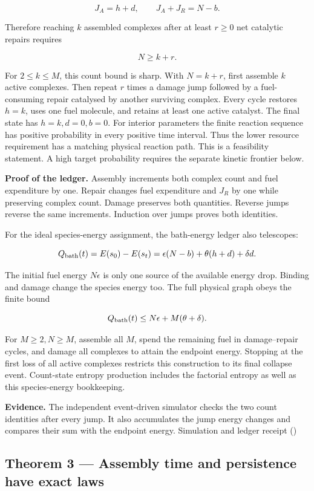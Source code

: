 \documentclass[
  11pt,
]{article}
\begin{document}
\[
J_A=h+d,\qquad J_A+J_R=N-b.
\]

Therefore reaching \(k\) assembled complexes after at least \(r\ge0\)
net catalytic repairs requires

\[
N\ge k+r.
\]

For \(2\le k\le M\), this count bound is sharp. With \(N=k+r\), first
assemble \(k\) active complexes. Then repeat \(r\) times a damage jump
followed by a fuel-consuming repair catalysed by another surviving
complex. Every cycle restores \(h=k\), uses one fuel molecule, and
retains at least one active catalyst. The final state has
\(h=k,d=0,b=0\). For interior parameters the finite reaction sequence
has positive probability in every positive time interval. Thus the lower
resource requirement has a matching physical reaction path. This is a
feasibility statement. A high target probability requires the separate
kinetic frontier below.

\textbf{Proof of the ledger.} Assembly increments both complex count and
fuel expenditure by one. Repair changes fuel expenditure and \(J_R\) by
one while preserving complex count. Damage preserves both quantities.
Reverse jumps reverse the same increments. Induction over jumps proves
both identities.

For the ideal species-energy assignment, the bath-energy ledger also
telescopes:

\[
Q_{\rm bath}(t)=E(s_0)-E(s_t)
=\epsilon(N-b)+\theta(h+d)+\delta d.
\]

The initial fuel energy \(N\epsilon\) is only one source of the
available energy drop. Binding and damage change the species energy too.
The full physical graph obeys the finite bound

\[
Q_{\rm bath}(t)\le N\epsilon+M(\theta+\delta).
\]

For \(M\ge2,N\ge M\), assemble all \(M\), spend the remaining fuel in
damage--repair cycles, and damage all complexes to attain the endpoint
energy. Stopping at the first loss of all active complexes restricts
this construction to its final collapse event. Count-state entropy
production includes the factorial entropy as well as this species-energy
bookkeeping.

\textbf{Evidence.} The independent event-driven simulator checks the two
count identities after every jump. It also accumulates the jump energy
changes and compares their sum with the endpoint energy. Simulation and
ledger receipt ()

\subsection{Theorem 3 --- Assembly time and persistence have exact
laws}\label{theorem-3-assembly-time-and-persistence-have-exact-laws}
\end{document}
